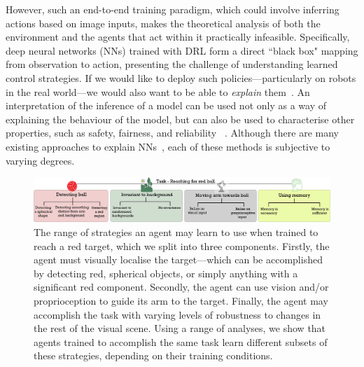 However, such an end-to-end training paradigm, which could involve inferring actions based on image inputs, makes the theoretical analysis of both the environment and the agents that act within it practically infeasible. Specifically, deep neural networks (NNs) trained with DRL form a direct ``black box" mapping from observation to action, presenting the challenge of understanding learned control strategies. If we would like to deploy such policies---particularly on robots in the real world---we would also want to be able to \emph{explain} them~\cite{arrieta2020explainable}. An interpretation of the inference of a model can be used not only as a way of explaining the behaviour of the model, but can also be used to characterise other properties, such as safety, fairness, and reliability ~\cite{doshi2017towards}. Although there are many existing approaches to explain NNs~\cite{guidotti2018survey}, each of these methods is subjective to varying degrees.
\begin{figure}[h!]
  \centering
  \includegraphics[width=\linewidth]{figures/chapter6/strategies.png}
  \caption{The range of strategies an agent may learn to use when trained to reach a red target, which we split into three components. Firstly, the agent must visually localise the target---which can be accomplished by detecting red, spherical objects, or simply anything with a significant red component. Secondly, the agent can use vision and/or proprioception to guide its arm to the target. Finally, the agent may accomplish the task with varying levels of robustness to changes in the rest of the visual scene. Using a range of analyses, we show that agents trained to accomplish the same task learn different subsets of these strategies, depending on their training conditions.}
  \label{fig:strategies}
\end{figure}

